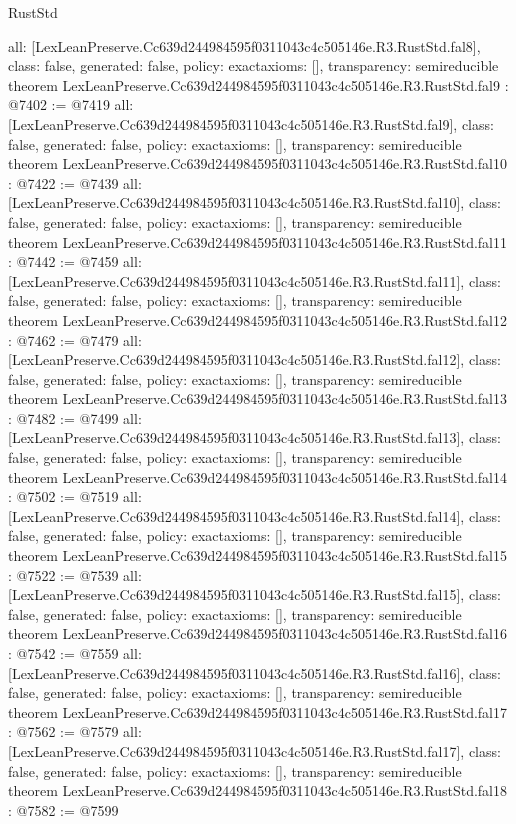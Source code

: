\begin{lexlean}{RustStd}
\begin{coremodule}
{  all: [LexLeanPreserve.Cc639d244984595f0311043c4c505146e.R3.RustStd.fal8],
  class: false,
  generated: false,
  policy: exact{axioms: []},
  transparency: semireducible
}
theorem LexLeanPreserve.Cc639d244984595f0311043c4c505146e.R3.RustStd.fal9 : @7402 := @7419 {
  all: [LexLeanPreserve.Cc639d244984595f0311043c4c505146e.R3.RustStd.fal9],
  class: false,
  generated: false,
  policy: exact{axioms: []},
  transparency: semireducible
}
theorem LexLeanPreserve.Cc639d244984595f0311043c4c505146e.R3.RustStd.fal10 : @7422 := @7439 {
  all: [LexLeanPreserve.Cc639d244984595f0311043c4c505146e.R3.RustStd.fal10],
  class: false,
  generated: false,
  policy: exact{axioms: []},
  transparency: semireducible
}
theorem LexLeanPreserve.Cc639d244984595f0311043c4c505146e.R3.RustStd.fal11 : @7442 := @7459 {
  all: [LexLeanPreserve.Cc639d244984595f0311043c4c505146e.R3.RustStd.fal11],
  class: false,
  generated: false,
  policy: exact{axioms: []},
  transparency: semireducible
}
theorem LexLeanPreserve.Cc639d244984595f0311043c4c505146e.R3.RustStd.fal12 : @7462 := @7479 {
  all: [LexLeanPreserve.Cc639d244984595f0311043c4c505146e.R3.RustStd.fal12],
  class: false,
  generated: false,
  policy: exact{axioms: []},
  transparency: semireducible
}
theorem LexLeanPreserve.Cc639d244984595f0311043c4c505146e.R3.RustStd.fal13 : @7482 := @7499 {
  all: [LexLeanPreserve.Cc639d244984595f0311043c4c505146e.R3.RustStd.fal13],
  class: false,
  generated: false,
  policy: exact{axioms: []},
  transparency: semireducible
}
theorem LexLeanPreserve.Cc639d244984595f0311043c4c505146e.R3.RustStd.fal14 : @7502 := @7519 {
  all: [LexLeanPreserve.Cc639d244984595f0311043c4c505146e.R3.RustStd.fal14],
  class: false,
  generated: false,
  policy: exact{axioms: []},
  transparency: semireducible
}
theorem LexLeanPreserve.Cc639d244984595f0311043c4c505146e.R3.RustStd.fal15 : @7522 := @7539 {
  all: [LexLeanPreserve.Cc639d244984595f0311043c4c505146e.R3.RustStd.fal15],
  class: false,
  generated: false,
  policy: exact{axioms: []},
  transparency: semireducible
}
theorem LexLeanPreserve.Cc639d244984595f0311043c4c505146e.R3.RustStd.fal16 : @7542 := @7559 {
  all: [LexLeanPreserve.Cc639d244984595f0311043c4c505146e.R3.RustStd.fal16],
  class: false,
  generated: false,
  policy: exact{axioms: []},
  transparency: semireducible
}
theorem LexLeanPreserve.Cc639d244984595f0311043c4c505146e.R3.RustStd.fal17 : @7562 := @7579 {
  all: [LexLeanPreserve.Cc639d244984595f0311043c4c505146e.R3.RustStd.fal17],
  class: false,
  generated: false,
  policy: exact{axioms: []},
  transparency: semireducible
}
theorem LexLeanPreserve.Cc639d244984595f0311043c4c505146e.R3.RustStd.fal18 : @7582 := @7599 {
}
\end{coremodule}
\end{lexlean}
